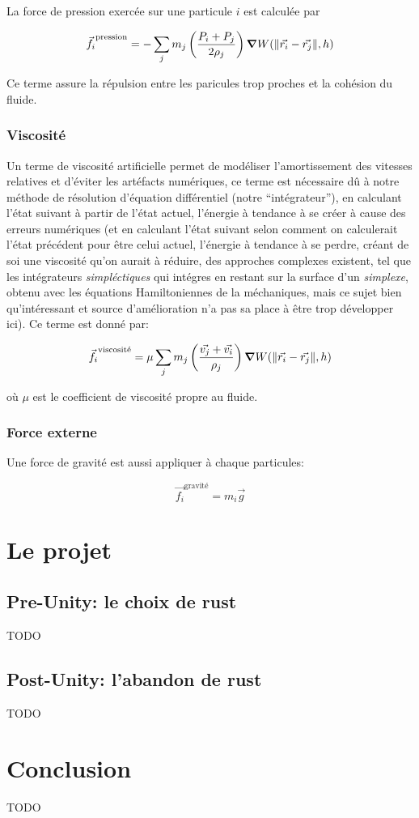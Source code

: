 \documentclass{article}
\begin{document}
La force de pression exercée sur une particule \(i\) est calculée par

\[
    \vec{f_i}^\text{pression} = - \sum_j m_j \left ( \frac{P_i + P_j}{2\rho_j}\right ) \grad W(\norm{\vec{r_i} - \vec{r_j}}, h)
\]

Ce terme assure la répulsion entre les paricules trop proches et la cohésion du fluide.

\subsubsection{Viscosité}

Un terme de viscosité artificielle permet de modéliser l'amortissement des vitesses relatives et d'éviter les artéfacts numériques, ce terme est nécessaire dû à notre méthode de résolution d'équation différentiel (notre ``intégrateur''), en calculant l'état suivant à partir de l'état actuel, l'énergie à tendance à se créer à cause des erreurs numériques (et en calculant l'état suivant selon comment on calculerait l'état précédent pour être celui actuel, l'énergie à tendance à se perdre, créant de soi une viscosité qu'on aurait à réduire, des approches complexes existent, tel que les intégrateurs {\emph {simpléctiques}} qui intégres en restant sur la surface d'un {\emph {simplexe}}, obtenu avec les équations Hamiltoniennes de la méchaniques, mais ce sujet bien qu'intéressant et source d'amélioration n'a pas sa place à être trop développer ici). Ce terme est donné par:

\[
    \vec{f_i}^\text{viscosité} = \mu \sum_j m_j \left ( \frac{\vec{v_j} + \vec{v_i}}{\rho_j}\right ) \grad W(\norm{\vec{r_i} - \vec{r_j}}, h)
\]

où \(\mu\) est le coefficient de viscosité propre au fluide.

\subsubsection{Force externe}

Une force de gravité est aussi appliquer à chaque particules:

\[
    \vec{f_i}^\text{gravité} = m_i \vec{g}
\]

\section{Le projet}
\subsection{Pre-Unity: le choix de rust}
TODO
\subsection{Post-Unity: l'abandon de rust}
TODO

\section{Conclusion}
TODO
\end{document}
